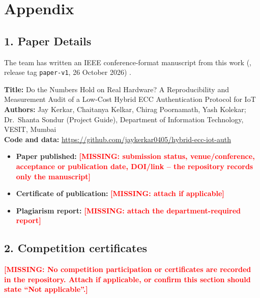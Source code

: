 \documentclass[12pt,a4paper,oneside]{report}
\numberwithin{equation}{chapter}
\newcommand{\MISSING}[1]{\textcolor{red}{\textbf{[MISSING: #1]}}}
\begin{document}
\clearpage
{}



\chapter*{Appendix}

\section*{1. Paper Details}
The team has written an IEEE conference-format manuscript from this work (, release tag \texttt{paper-v1}, 26 October 2026) \cite{kerkar2026audit}.

\noindent\textbf{Title:} Do the Numbers Hold on Real Hardware? A Reproducibility and Measurement Audit of a Low-Cost Hybrid ECC Authentication Protocol for IoT\\
\textbf{Authors:} Jay Kerkar, Chaitanya Kelkar, Chirag Poornamath, Yash Kolekar; Dr.\ Shanta Sondur (Project Guide), Department of Information Technology, VESIT, Mumbai\\
\textbf{Code and data:} \url{https://github.com/jaykerkar0405/hybrid-ecc-iot-auth}

\begin{itemize}
  \item \textbf{Paper published:} \MISSING{submission status, venue/conference, acceptance or publication date, DOI/link -- the repository records only the manuscript}
  \item \textbf{Certificate of publication:} \MISSING{attach if applicable}
  \item \textbf{Plagiarism report:} \MISSING{attach the department-required report}
\end{itemize}

\section*{2. Competition certificates}
\MISSING{No competition participation or certificates are recorded in the repository. Attach if applicable, or confirm this section should state ``Not applicable''.}
\end{document}
